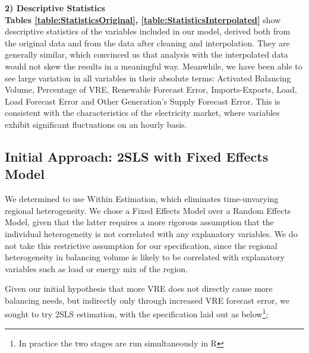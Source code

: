 \documentclass[12pt]{article}
\begin{document}
\textbf{2) Descriptive Statistics}\\
\textbf{Tables \ref{table:StatisticsOriginal}, \ref{table:StatisticsInterpolated}} show descriptive statistics of the variables included in our model, derived both from the original data and from the data after cleaning and interpolation. They are generally similar, which convinced us that analysis with the interpolated data would not skew the results in a meaningful way. Meanwhile, we have been able to see large variation in all variables in their absolute terms: Activated Balancing Volume, Percentage of VRE, Renewable Forecast Error, Imports-Exports, Load, Load Forecast Error and Other Generation's Supply Forecast Error. This is consistent with the characteristics of the electricity market, where variables exhibit significant fluctuations on an hourly basis.\par


\subsection{Initial Approach: 2SLS with Fixed Effects Model}
We determined to use Within Estimation, which eliminates time-unvarying regional heterogeneity. We chose a Fixed Effects Model over a Random Effects Model, given that the latter requires a more rigorous assumption that the individual heterogeneity is not correlated with any explanatory variables. We do not take this restrictive assumption for our specification, since the regional heterogeneity in balancing volume is likely to be correlated with explanatory variables such as load or energy mix of the region.\par

Given our initial hypothesis that more VRE does not directly cause more balancing needs, but indirectly only through increased VRE forecast error, we sought to try 2SLS estimation, with the specification laid out as below\footnote{In practice the two stages are run simultaneously in R};
\end{document}
